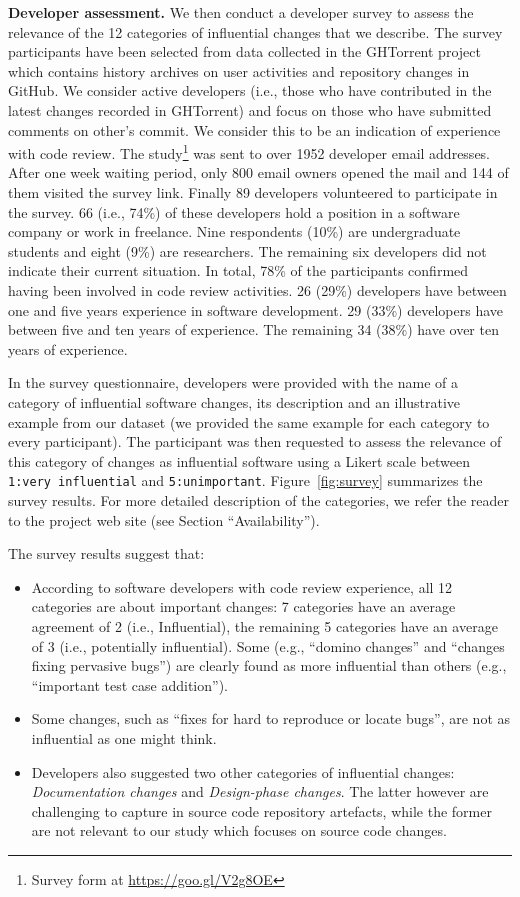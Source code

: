 \textbf{Developer assessment.}
We then conduct a developer survey to assess the relevance of the 12 categories of influential changes that we describe. 
The survey participants have been selected from data collected in the GHTorrent project~\cite{Gousi13} which contains history
archives on user activities and repository changes in GitHub. We consider active developers (i.e., those who have contributed in the latest changes recorded in GHTorrent) and focus on those who have submitted comments on other's commit. We consider this to be an indication of experience with code review. The study\footnote{Survey form at \url{https://goo.gl/V2g8OE}} was sent to over 1952 developer email addresses. After one week waiting period, only 800 email owners opened the mail and 144 of them visited the survey link. Finally 89 developers volunteered to participate in the survey. 66 (i.e., 74\%) of these developers hold a position in a software company or work in freelance. Nine respondents (10\%) are undergraduate students and eight (9\%) are researchers. The remaining six developers did not indicate their current situation. In total, 78\% of the participants confirmed having been involved in code review activities. 26 (29\%) developers have between one and five years experience in software development. 29 (33\%) developers have between five and ten years of experience. The remaining 34 (38\%) have over ten years of experience. 

In the survey questionnaire, developers were provided with the name of a category of influential software changes, its description and an illustrative example from our dataset (we provided the same example for each category to every participant). The participant was then requested to assess the relevance of this category of changes as influential software using a Likert scale between {\tt 1:very influential} and {\tt 5:unimportant}. Figure~\ref{fig:survey} summarizes the survey results. For more detailed description of the categories, we refer the reader to the project web site (see Section ``Availability'').

The survey results suggest that:
\begin{itemize}
	\item According to software developers with code review experience, all 12 categories are about important changes: 7 categories have an average agreement of 2 (i.e., Influential), the remaining 5 categories have an average of 3 (i.e., potentially influential). Some (e.g.,  ``domino changes'' and ``changes fixing pervasive bugs'') are clearly found as more influential than others (e.g., ``important test case addition'').
	\item Some changes, such as ``fixes for hard to reproduce or locate bugs'', are not as influential as one might think.
	\item Developers also suggested two other categories of influential changes: {\em Documentation changes} and {\em Design-phase changes}. The latter however are challenging to capture in source code repository artefacts, while the former are not relevant to our study which focuses on source code changes.
\end{itemize}

